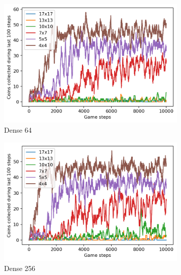 
\begin{figure}
  \centering
  \begin{subfigure}[b]{0.48\linewidth}
    \centering
    	\includegraphics[width=\linewidth]{images/minigame-dense64-arch.png}
    \caption{Dense 64}
    \label{fig:network-dense64}
  \end{subfigure}
  \quad
  \begin{subfigure}[b]{0.48\linewidth}
    \centering
      \includegraphics[width=\linewidth]{images/minigame-dense256-arch.png}
    \caption{Dense 256}
    \label{fig:network-dense256}
  \end{subfigure}
  \begin{subfigure}[b]{0.48\linewidth}
    \centering

\end{subfigure}
\end{figure}
